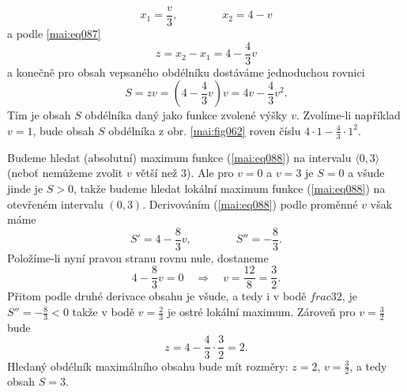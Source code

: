 \begin{mdframed}[style=mdexam]
\begin{example}
\begin{equation*}
      x_1 = \dfrac{v}{3}, \qquad\qquad  x_2 = 4 - v 
    \end{equation*}
    a podle \ref{mai:eq087}
    \begin{equation*}
      z = x_2 - x_1 =  4 - \dfrac{4}{3}v
    \end{equation*}
    a konečně pro obsah vepsaného obdélníku dostáváme jednoduchou rovnici
    \begin{equation}\label{mai:eq088}
      S = zv = \left(4 - \dfrac{4}{3}v\right)v = 4v - \dfrac{4}{3}v^2.
    \end{equation} 
    Tím je obsah \(S\) obdélníka daný jako funkce zvolené výšky \(v\). Zvolíme-li například \(v=1\),
    bude obsah \(S\) obdélníka z obr. \ref{mai:fig062} roven číslu \(4\cdot1 -
    \frac{4}{3}\cdot1^2\). 
    
    Budeme hledat (absolutní) maximum funkce (\ref{mai:eq088}) na intervalu \(\langle0,3\rangle\)
    (neboť nemůžeme zvolit \(v\) větší než 3). Ale pro \(v=0\) a \(v=3\) je \(S=0\) a všude jinde je
    \(S > 0\), takže budeme hledat lokální maximum funkce (\ref{mai:eq088}) na otevřeném intervalu
    \((0,3)\). Derivováním (\ref{mai:eq088}) podle proměnné \(v\) však máme
    \begin{equation*}
      S' = 4 - \dfrac{8}{3}v, \qquad\qquad S'' = -\dfrac{8}{3}.
    \end{equation*}
    Položíme-li nyní pravou stranu rovnu nule, dostaneme 
    \begin{equation*}
      4 - \dfrac{8}{3}v = 0 \quad\Rightarrow\quad v = \dfrac{12}{8} = \dfrac{3}{2}.
    \end{equation*}
    Přitom podle druhé derivace obsahu je všude, a tedy i v bodě \(frac{3}{2}\), je
    \(S''=-\frac{8}{3}<0\) takže v bodě \(v = \frac{2}{3}\) je ostré lokální maximum. Zároveň pro
    \(v=\frac{3}{2}\) bude
    \begin{equation*}
      z = 4 - \dfrac{4}{3}\cdot\dfrac{3}{2} = 2.
    \end{equation*}
    Hledaný obdélník maximálního obsahu bude mít rozměry: \(z = 2\), \(v = \frac{3}{2}\), a tedy
    obsah \(S = 3\).    
  \end{example}
\end{mdframed}



